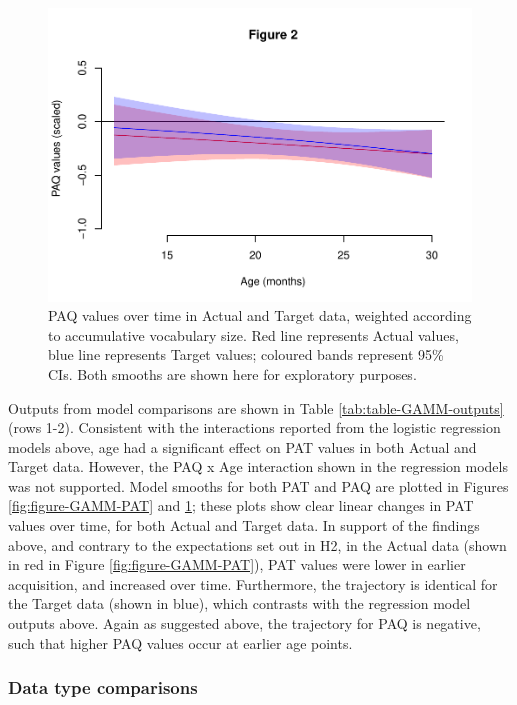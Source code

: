 \documentclass[
  man]{apa6}
\begin{document}
\begin{figure}
\centering
\includegraphics{PhonNetworksProj_files/figure-latex/figure-GAMM-PAQ-1.pdf}
\caption{\label{fig:figure-GAMM-PAQ}PAQ values over time in Actual and Target data, weighted according to accumulative vocabulary size. Red line represents Actual values, blue line represents Target values; coloured bands represent 95\% CIs. Both smooths are shown here for exploratory purposes.}
\end{figure}

Outputs from model comparisons are shown in Table \ref{tab:table-GAMM-outputs} (rows 1-2). Consistent with the interactions reported from the logistic regression models above, age had a significant effect on PAT values in both Actual and Target data. However, the PAQ x Age interaction shown in the regression models was not supported. Model smooths for both PAT and PAQ are plotted in Figures \ref{fig:figure-GAMM-PAT} and \ref{fig:figure-GAMM-PAQ}; these plots show clear linear changes in PAT values over time, for both Actual and Target data. In support of the findings above, and contrary to the expectations set out in H2, in the Actual data (shown in red in Figure \ref{fig:figure-GAMM-PAT}), PAT values were lower in earlier acquisition, and increased over time. Furthermore, the trajectory is identical for the Target data (shown in blue), which contrasts with the regression model outputs above. Again as suggested above, the trajectory for PAQ is negative, such that higher PAQ values occur at earlier age points.

\hypertarget{data-type-comparisons}{%
\subsubsection{Data type comparisons}\label{data-type-comparisons}}
\end{document}
